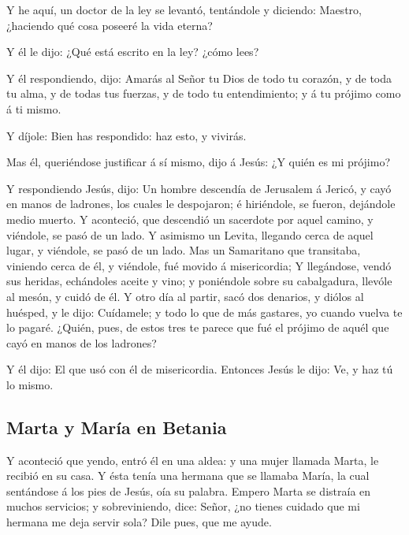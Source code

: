  Y he aquí, un doctor de la ley se levantó, tentándole y
diciendo: Maestro, ¿haciendo qué cosa poseeré la vida eterna?

 Y él le dijo: ¿Qué está escrito en la ley? ¿cómo lees?

 Y él respondiendo, dijo: Amarás al Señor tu Dios de todo
tu corazón, y de toda tu alma, y de todas tus fuerzas, y de todo tu
entendimiento; y á tu prójimo como á ti mismo.

 Y díjole: Bien has respondido: haz esto, y vivirás.

 Mas él, queriéndose justificar á sí mismo, dijo á Jesús:
¿Y quién es mi prójimo?

 Y respondiendo Jesús, dijo: Un hombre descendía de
Jerusalem á Jericó, y cayó en manos de ladrones, los cuales le
despojaron; é hiriéndole, se fueron, dejándole medio muerto.
 Y aconteció, que descendió un sacerdote por aquel
camino, y viéndole, se pasó de un lado.  Y asimismo un
Levita, llegando cerca de aquel lugar, y viéndole, se pasó de un lado.
 Mas un Samaritano que transitaba, viniendo cerca de él,
y viéndole, fué movido á misericordia;  Y llegándose,
vendó sus heridas, echándoles aceite y vino; y poniéndole sobre su
cabalgadura, llevóle al mesón, y cuidó de él.  Y otro día
al partir, sacó dos denarios, y diólos al huésped, y le dijo: Cuídamele;
y todo lo que de más gastares, yo cuando vuelva te lo pagaré.
 ¿Quién, pues, de estos tres te parece que fué el prójimo
de aquél que cayó en manos de los ladrones?

 Y él dijo: El que usó con él de misericordia. Entonces
Jesús le dijo: Ve, y haz tú lo mismo.

\hypertarget{marta-y-maruxeda-en-betania}{%
\subsection{Marta y María en
Betania}\label{marta-y-maruxeda-en-betania}}

 Y aconteció que yendo, entró él en una aldea: y una
mujer llamada Marta, le recibió en su casa.  Y ésta tenía
una hermana que se llamaba María, la cual sentándose á los pies de
Jesús, oía su palabra.  Empero Marta se distraía en
muchos servicios; y sobreviniendo, dice: Señor, ¿no tienes cuidado que
mi hermana me deja servir sola? Dile pues, que me ayude.

